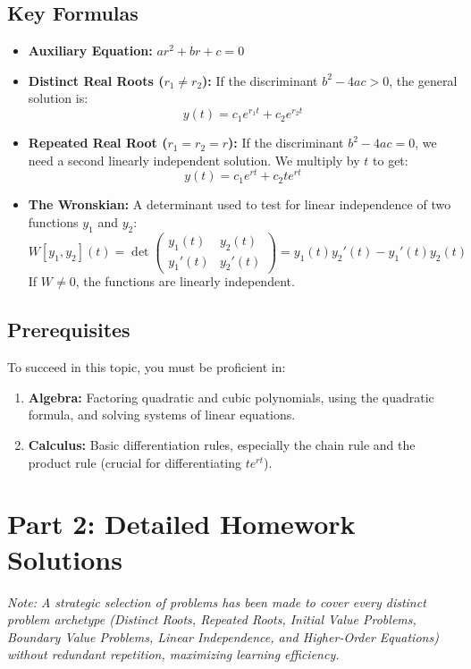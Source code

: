 \documentclass[12pt]{article}
\begin{document}
\subsection{Key Formulas}
\begin{itemize}
    \item \textbf{Auxiliary Equation:} $a r^2 + b r + c = 0$
    \item \textbf{Distinct Real Roots ($r_1 \neq r_2$):} If the discriminant $b^2 - 4ac > 0$, the general solution is:
    \[ y(t) = c_1 e^{r_1 t} + c_2 e^{r_2 t} \]
    \item \textbf{Repeated Real Root ($r_1 = r_2 = r$):} If the discriminant $b^2 - 4ac = 0$, we need a second linearly independent solution. We multiply by $t$ to get:
    \[ y(t) = c_1 e^{rt} + c_2 t e^{rt} \]
    \item \textbf{The Wronskian:} A determinant used to test for linear independence of two functions $y_1$ and $y_2$:
    \[ W[y_1, y_2](t) = \det \begin{pmatrix} y_1(t) & y_2(t) \\ y_1'(t) & y_2'(t) \end{pmatrix} = y_1(t) y_2'(t) - y_1'(t) y_2(t) \]
    If $W \neq 0$, the functions are linearly independent.
\end{itemize}

\subsection{Prerequisites}
To succeed in this topic, you must be proficient in:
\begin{enumerate}
    \item \textbf{Algebra:} Factoring quadratic and cubic polynomials, using the quadratic formula, and solving systems of linear equations.
    \item \textbf{Calculus:} Basic differentiation rules, especially the chain rule and the product rule (crucial for differentiating $t e^{rt}$).
\end{enumerate}

\newpage
\section{Part 2: Detailed Homework Solutions}
\textit{Note: A strategic selection of problems has been made to cover every distinct problem archetype (Distinct Roots, Repeated Roots, Initial Value Problems, Boundary Value Problems, Linear Independence, and Higher-Order Equations) without redundant repetition, maximizing learning efficiency.}
\end{document}
